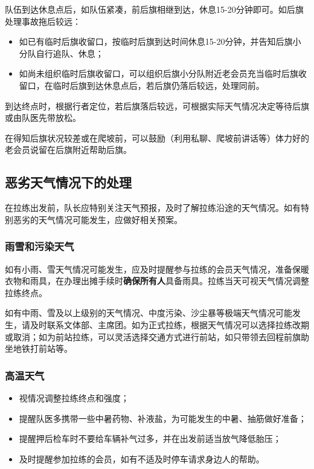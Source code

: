 \documentclass[UTF8]{ctexart}
\begin{document}
队伍到达休息点后，如队伍紧凑，前后旗相继到达，休息15-20分钟即可。如后旗处理事故拖后较远：
\begin{itemize}[nosep,left=2em]
    \item 如已有临时后旗收留口，按临时后旗到达时间休息15-20分钟，并告知后旗小分队自行追队、休息；
    \item 如尚未组织临时后旗收留口，可以组织后旗小分队附近老会员充当临时后旗收留口，在临时后旗到达休息点后，若后旗仍落后较远，处理同前。
\end{itemize}

到达终点时，根据行者定位，若后旗落后较远，可根据实际天气情况决定等待后旗或由队医先带放松。

在得知后旗状况较差或在爬坡前，可以鼓励（利用私聊、爬坡前讲话等）体力好的老会员说留在后旗附近帮助后旗。

\subsection{恶劣天气情况下的处理}

在拉练出发前，队长应特别关注天气预报，及时了解拉练沿途的天气情况。如有特别恶劣的天气情况可能发生，应做好相关预案。

\subsubsection{雨雪和污染天气}

如有小雨、雪天气情况可能发生，应及时提醒参与拉练的会员天气情况，准备保暖衣物和雨具，在办理出摊手续时\textbf{确保所有人}具备雨具。拉练当天可视天气情况调整拉练终点。

如有中雨、雪及以上级别的天气情况、中度污染、沙尘暴等极端天气情况可能发生，请及时联系文体部、主席团。如为正式拉练，根据天气情况可以选择拉练改期或取消；如为前站拉练，可以灵活选择交通方式进行前站，如只带领去回程前旗助坐地铁打前站等。

\subsubsection{高温天气}

\begin{itemize}[nosep,left=2em]
    \item 视情况调整拉练终点和强度；
    \item 提醒队医多携带一些中暑药物、补液盐，为可能发生的中暑、抽筋做好准备；
    \item 提醒押后检车时不要给车辆补气过多，并在出发前适当放气降低胎压；
    \item 及时提醒参加拉练的会员，如有不适及时停车请求身边人的帮助。
\end{itemize}
\end{document}
